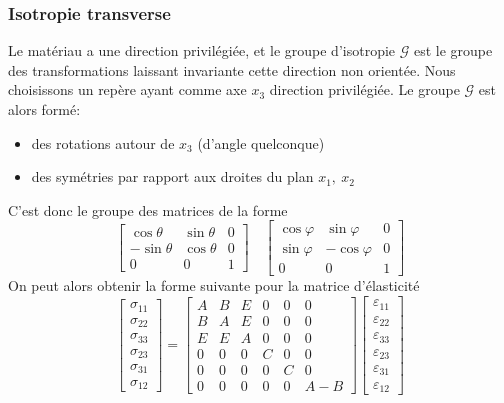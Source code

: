 \subsubsection{Isotropie transverse}
Le matériau a une direction privilégiée, et le groupe d'isotropie $\mathcal{G}$ est le groupe des transformations laissant invariante cette direction non orientée.
Nous choisissons un repère ayant comme axe $x_3$ direction privilégiée.
Le groupe $\mathcal{G}$ est alors formé:
\begin{itemize}
    \item des rotations autour de $x_3$ (d'angle quelconque)
    \item des symétries par rapport aux droites du plan $x_1,\ x_2$
\end{itemize}
C'est donc le groupe des matrices de la forme 
\begin{equation}
    \begin{bmatrix}
        \cos \theta & \sin \theta & 0 \\
        -\sin \theta & \cos \theta & 0 \\
        0 & 0 & 1
    \end{bmatrix}
    \quad
    \begin{bmatrix}
        \cos \varphi & \sin \varphi & 0 \\
        \sin \varphi & -\cos \varphi & 0 \\
        0 & 0 & 1
    \end{bmatrix}
    \label{eq:Ch05-019}
\end{equation}
On peut alors obtenir la forme suivante pour la matrice d'élasticité 
\begin{equation}
    \begin{bmatrix}
        \sigma_{11}\\
        \sigma_{22}\\
        \sigma_{33}\\
        \sigma_{23}\\
        \sigma_{31}\\
        \sigma_{12}
    \end{bmatrix}
    =
    \begin{bmatrix}
        A & B & E & 0 & 0 & 0 \\
        B & A & E & 0 & 0 & 0 \\
        E & E & A & 0 & 0 & 0 \\
        0 & 0 & 0 & C & 0 & 0 \\
        0 & 0 & 0 & 0 & C & 0 \\
        0 & 0 & 0 & 0 & 0 & A-B
    \end{bmatrix}
    \begin{bmatrix}
        \varepsilon_{11}\\
        \varepsilon_{22}\\
        \varepsilon_{33}\\
        \varepsilon_{23}\\
        \varepsilon_{31}\\
        \varepsilon_{12}
    \end{bmatrix}
    \label{eq:Ch05-020}
\end{equation}
